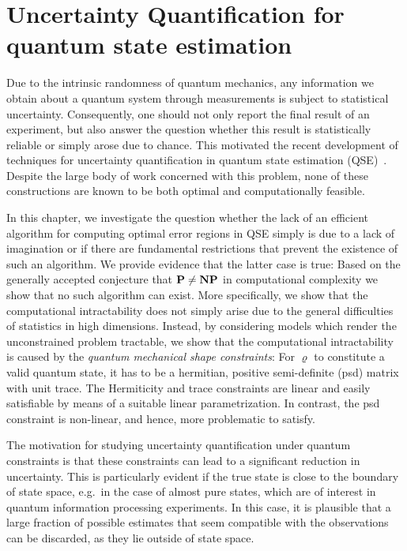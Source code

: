 
\chapter{Uncertainty Quantification for quantum state estimation}%
\label{chap:error}


Due to the intrinsic randomness of quantum mechanics, any information we obtain about a quantum system through measurements is subject to statistical uncertainty.
Consequently, one should not only report the final result of an experiment, but also answer the question whether this result is statistically reliable or simply arose due to chance.
This motivated the recent development of techniques for uncertainty quantification in quantum state estimation (QSE)~\cite{Kohout_2012_Robust,Ferrie_2014_High,Shang_2013_Optimal,Faist_2015_Practical,Christandl_2012_Reliable,Audenaert_2009_Quantum,Audenaert_2008_Asymptotic}.
Despite the large body of work concerned with this problem, none of these constructions are known to be both optimal and computationally feasible.

In this chapter, we investigate the question whether the lack of an efficient algorithm for computing optimal error regions in QSE simply is due to a lack of imagination or if there are fundamental restrictions that prevent the existence of such an algorithm.
We provide evidence that the latter case is true:
Based on the generally accepted conjecture that $\mathbf{P} \neq \mathbf{NP}$ in computational complexity we show that no such algorithm can exist.
More specifically, we show that the computational intractability does not simply arise due to the  general difficulties of statistics in high dimensions.
Instead, by considering models which render the unconstrained problem tractable, we show that the computational intractability is caused by the \emph{quantum mechanical shape constraints}:
For $\varrho$ to constitute a valid quantum state, it has to be a hermitian, positive semi-definite (psd) matrix with unit trace.
The Hermiticity and trace constraints are linear and easily satisfiable by means of a suitable linear parametrization.
In contrast, the psd constraint is non-linear, and hence, more problematic to satisfy.

The motivation for studying uncertainty quantification under quantum constraints is that these constraints can lead to a significant reduction in uncertainty.
This is particularly evident if the true state is close to the boundary of state space, e.g.\ in the case of almost pure states, which are of interest in quantum information processing experiments.
In this case, it is plausible that a large fraction of possible estimates that seem compatible with the observations can be discarded, as they lie outside of state space.

